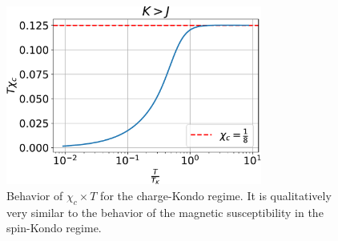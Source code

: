 \documentclass[12pt,twoside]{report}
\numberwithin{equation}{section}
\begin{document}
\begin{figure}[htpb]
	\centering
	\includegraphics[width=0.75\textwidth]{../figures/T_chi_c.pdf}
	\caption{Behavior of \(\chi_c\times T\) for the charge-Kondo regime. It is qualitatively very similar to the behavior of the magnetic susceptibility in the spin-Kondo regime.}
\end{figure}
\end{document}

